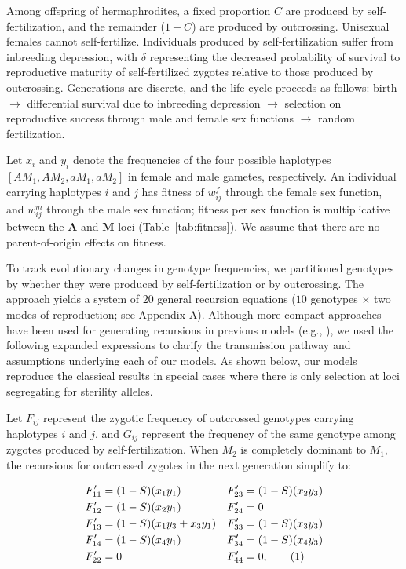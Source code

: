 \documentclass{article}
\newcommand\numberthis{\addtocounter{equation}{1}\tag{\theequation}}
\begin{document}
Among offspring of hermaphrodites, a fixed proportion $C$ are produced by self-fertilization, and the remainder ($1 - C$) are produced by outcrossing. Unisexual females cannot self-fertilize. Individuals produced by self-fertilization suffer from inbreeding depression, with $\delta$ representing the decreased probability of survival to reproductive maturity of self-fertilized zygotes relative to those produced by outcrossing. Generations are discrete, and the life-cycle proceeds as follows: birth $\rightarrow$ differential survival due to inbreeding depression $\rightarrow$ selection on reproductive success through male and female sex functions $\rightarrow$ random fertilization.

Let $x_i$ and $y_i$ denote the frequencies of the four possible haplotypes $[AM_1,AM_2,aM_1,aM_2]$ in female and male gametes, respectively. An individual carrying haplotypes $i$ and $j$ has fitness of $w^f_{ij}$ through the female sex function, and $w^m_{ij}$ through the male sex function; fitness per sex function is multiplicative between the $\mathbf{A}$ and $\mathbf{M}$ loci (Table~\ref{tab:fitness}). We assume that there are no parent-of-origin effects on fitness.

To track evolutionary changes in genotype frequencies, we partitioned genotypes by whether they were produced by self-fertilization or by outcrossing. The approach yields a system of $20$ general recursion equations ($10$ genotypes $\times$ two modes of reproduction; see Appendix A). Although more compact approaches have been used for generating recursions in previous models (e.g., \citealt{Charlesworth1978a, Charlesworth2010}), we used the following expanded expressions to clarify the transmission pathway and assumptions underlying each of our models. As shown below, our models reproduce the classical results in special cases where there is only selection at loci segregating for sterility alleles.

Let $F_{ij}$ represent the zygotic frequency of outcrossed genotypes carrying haplotypes $i$ and $j$, and $G_{ij}$ represent the frequency of the same genotype among zygotes produced by self-fertilization. When $M_2$ is completely dominant to $M_1$, the recursions for outcrossed zygotes in the next generation simplify to:
\begin{linenomath}\begin{align*} \label{eq:FprGyn}
    F'_{11} &= (1 - S) (x_1 y_1)            & F'_{23} &= (1 - S) (x_2 y_3)  \\
    F'_{12} &= (1 - S) (x_2 y_1)            & F'_{24} &= 0 \\
    F'_{13} &= (1 - S) (x_1 y_3 + x_3 y_1)  & F'_{33} &= (1 - S) (x_3 y_3)  \\
    F'_{14} &= (1 - S) (x_4 y_1)            & F'_{34} &= (1 - S) (x_4 y_3)  \\
    F'_{22} &= 0                            & F'_{44} &= 0, \numberthis
\end{align*}\end{linenomath}
\end{document}
